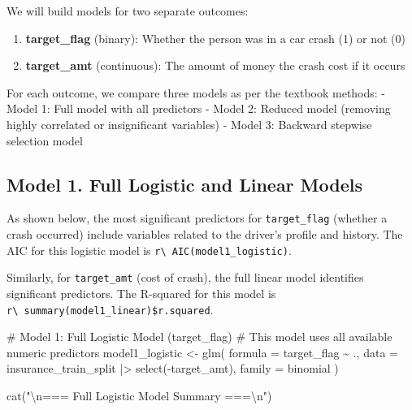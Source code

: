 \documentclass[
  11pt]{article}
\newenvironment{Shaded}{\begin{snugshade}}{\end{snugshade}}
\newcommand{\AttributeTok}[1]{\textcolor[rgb]{0.40,0.45,0.13}{#1}}
\newcommand{\CommentTok}[1]{\textcolor[rgb]{0.37,0.37,0.37}{#1}}
\newcommand{\FunctionTok}[1]{\textcolor[rgb]{0.28,0.35,0.67}{#1}}
\newcommand{\NormalTok}[1]{\textcolor[rgb]{0.00,0.23,0.31}{#1}}
\newcommand{\OtherTok}[1]{\textcolor[rgb]{0.00,0.23,0.31}{#1}}
\newcommand{\SpecialCharTok}[1]{\textcolor[rgb]{0.37,0.37,0.37}{#1}}
\newcommand{\StringTok}[1]{\textcolor[rgb]{0.13,0.47,0.30}{#1}}
\providecommand{\tightlist}{%
  \setlength{\itemsep}{0pt}\setlength{\parskip}{0pt}}
\begin{document}
We will build models for two separate outcomes:

\begin{enumerate}
\def\labelenumi{\arabic{enumi}.}
\tightlist
\item
  \textbf{target\_flag} (binary): Whether the person was in a car crash
  (1) or not (0)
\item
  \textbf{target\_amt} (continuous): The amount of money the crash cost
  if it occurs
\end{enumerate}

For each outcome, we compare three models as per the textbook methods: -
Model 1: Full model with all predictors - Model 2: Reduced model
(removing highly correlated or insignificant variables) - Model 3:
Backward stepwise selection model

\subsection{Model 1. Full Logistic and Linear
Models}\label{model-1.-full-logistic-and-linear-models}

As shown below, the most significant predictors for
\texttt{target\_flag} (whether a crash occurred) include variables
related to the driver's profile and history. The AIC for this logistic
model is \texttt{r\textbackslash{}\ AIC(model1\_logistic)}.

Similarly, for \texttt{target\_amt} (cost of crash), the full linear
model identifies significant predictors. The R-squared for this model is
\texttt{r\textbackslash{}\ summary(model1\_linear)\$r.squared}.

\begin{Shaded}
\begin{Highlighting}[]
\CommentTok{\# Model 1: Full Logistic Model (target\_flag)}
\CommentTok{\# This model uses all available numeric predictors}
\NormalTok{model1\_logistic }\OtherTok{\textless{}{-}} \FunctionTok{glm}\NormalTok{(}
    \AttributeTok{formula =}\NormalTok{ target\_flag }\SpecialCharTok{\textasciitilde{}}\NormalTok{ .,}
    \AttributeTok{data =}\NormalTok{ insurance\_train\_split }\SpecialCharTok{|\textgreater{}} \FunctionTok{select}\NormalTok{(}\SpecialCharTok{{-}}\NormalTok{target\_amt),}
    \AttributeTok{family =}\NormalTok{ binomial}
\NormalTok{)}

\FunctionTok{cat}\NormalTok{(}\StringTok{"}\SpecialCharTok{\textbackslash{}n}\StringTok{=== Full Logistic Model Summary ===}\SpecialCharTok{\textbackslash{}n}\StringTok{"}\NormalTok{)}
\end{Highlighting}
\end{Shaded}
\end{document}
